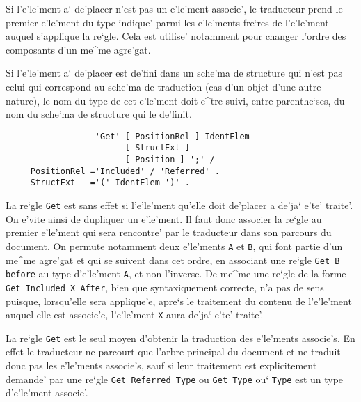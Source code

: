 {\begin{description}
 Si l'e'le'ment a` de'placer n'est pas un e'le'ment associe', le traducteur prend le
 premier  e'le'ment du type indique' parmi les e'le'ments fre`res de l'e'le'ment
 auquel s'applique la re`gle. Cela est utilise' notamment pour changer l'ordre
 des composants d'un me^me agre'gat.
\end{description}

Si l'e'le'ment a` de'placer est de'fini dans un sche'ma de structure qui n'est
pas celui qui correspond au sche'ma de traduction (cas d'un objet d'une
autre nature), le nom du type de cet e'le'ment doit e^tre suivi, entre
parenthe`ses, du nom du sche'ma de structure qui le de'finit.

\begin{verbatim}
                  'Get' [ PositionRel ] IdentElem 
                        [ StructExt ]
                        [ Position ] ';' /
     PositionRel ='Included' / 'Referred' .
     StructExt   ='(' IdentElem ')' .
\end{verbatim}

La re`gle {\tt Get} est sans effet si l'e'le'ment qu'elle doit de'placer a
de'ja` e'te' traite'. On e'vite ainsi de dupliquer un e'le'ment. Il faut donc
associer la re`gle au premier e'le'ment qui sera rencontre' par le traducteur
dans son parcours du document. On permute notamment deux e'le'ments {\tt A} et
{\tt B}, qui font partie d'un me^me agre'gat et qui se suivent dans cet ordre,
en associant une re`gle {\tt Get B before} au type d'e'le'ment {\tt A}, et non
l'inverse.
De me^me une re`gle de la forme {\tt Get Included X After}, bien que
syntaxiquement correcte, n'a pas de sens puisque, lorsqu'elle sera applique'e,
apre`s le traitement du contenu de l'e'le'ment auquel elle est associe'e,
l'e'le'ment {\tt X} aura de'ja` e'te' traite'.

La re`gle {\tt Get} est le seul moyen d'obtenir la traduction des e'le'ments
associe's. En effet le traducteur ne parcourt que l'arbre principal du document
et ne traduit donc pas les e'le'ments associe's, sauf si leur traitement est
explicitement demande' par une re`gle {\tt Get Referred Type} ou {\tt Get Type}
ou` {\tt Type} est un type d'e'le'ment associe'.

}
